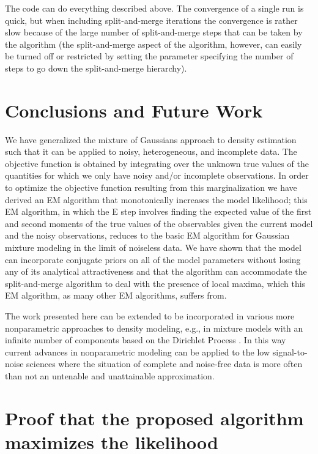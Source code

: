 \documentclass[aoas,preprint,authoryear,round]{imsart}
\newcommand{\eg}{e.g.}
\begin{document}
The code can do everything described above. The convergence of a
single run is quick, but when including split-and-merge iterations the
convergence is rather slow because of the large number of
split-and-merge steps that can be taken by the algorithm (the
split-and-merge aspect of the algorithm, however, can easily be turned
off or restricted by setting the parameter specifying the number of
steps to go down the split-and-merge hierarchy).


\section{Conclusions and Future Work}

We have generalized the mixture of Gaussians approach to density
estimation such that it can be applied to noisy, heterogeneous, and
incomplete data. The objective function is obtained by integrating
over the unknown true values of the quantities for which we only have
noisy and/or incomplete observations. In order to optimize the
objective function resulting from this marginalization we have derived
an EM algorithm that monotonically increases the model likelihood;
this EM algorithm, in which the E step involves finding the expected
value of the first and second moments of the true values of the
observables given the current model and the noisy observations,
reduces to the basic EM algorithm for Gaussian mixture modeling in the
limit of noiseless data. We have shown that the model can incorporate
conjugate priors on all of the model parameters without losing any of
its analytical attractiveness and that the algorithm can accommodate
the split-and-merge algorithm to deal with the presence of local
maxima, which this EM algorithm, as many other EM algorithms, suffers
from.

The work presented here can be extended to be incorporated in various
more nonparametric approaches to density modeling, \eg, in mixture
models with an infinite number of components based on the Dirichlet
Process \citep[\eg,][]{rasmussen00infinite}. In this way current
advances in nonparametric modeling can be applied to the low
signal-to-noise sciences where the situation of complete and
noise-free data is more often than not an untenable and unattainable
approximation.


\appendix

\section{Proof that the proposed algorithm maximizes the likelihood}\label{sec:convergenceproof}
\end{document}
